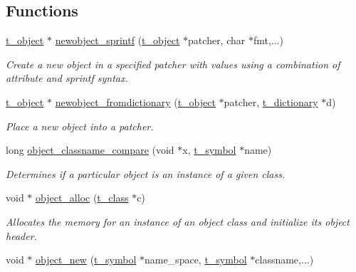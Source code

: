 \subsection*{Functions}
\begin{DoxyCompactItemize}
\item 
\hyperlink{structt__object}{t\_\-object} $\ast$ \hyperlink{group__obj_gad81c665a20c3c707decaf3403468ff47}{newobject\_\-sprintf} (\hyperlink{structt__object}{t\_\-object} $\ast$patcher, char $\ast$fmt,...)
\begin{DoxyCompactList}\small\item\em Create a new object in a specified patcher with values using a combination of attribute and sprintf syntax. \item\end{DoxyCompactList}\item 
\hyperlink{structt__object}{t\_\-object} $\ast$ \hyperlink{group__obj_gaed2c4e1d0c80d929b97ccf07a886faeb}{newobject\_\-fromdictionary} (\hyperlink{structt__object}{t\_\-object} $\ast$patcher, \hyperlink{structt__dictionary}{t\_\-dictionary} $\ast$d)
\begin{DoxyCompactList}\small\item\em Place a new object into a patcher. \item\end{DoxyCompactList}\item 
long \hyperlink{group__obj_ga020d01fb1a55690dc760450bac6a624a}{object\_\-classname\_\-compare} (void $\ast$x, \hyperlink{structt__symbol}{t\_\-symbol} $\ast$name)
\begin{DoxyCompactList}\small\item\em Determines if a particular object is an instance of a given class. \item\end{DoxyCompactList}\item 
void $\ast$ \hyperlink{group__obj_gacb89ef27c34b45e9037d877375804284}{object\_\-alloc} (\hyperlink{structt__class}{t\_\-class} $\ast$c)
\begin{DoxyCompactList}\small\item\em Allocates the memory for an instance of an object class and initialize its object header. \item\end{DoxyCompactList}\item 
void $\ast$ \hyperlink{group__obj_gac4b370265c776db4f545d257089af1cf}{object\_\-new} (\hyperlink{structt__symbol}{t\_\-symbol} $\ast$name\_\-space, \hyperlink{structt__symbol}{t\_\-symbol} $\ast$classname,...)

\end{DoxyCompactItemize}
